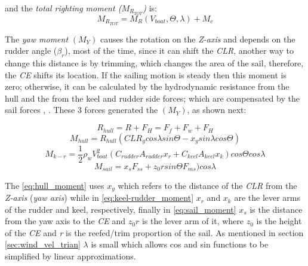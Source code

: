 and the \textit{total righting moment ($M_{R_{TOT}}$)} is:
\begin{equation} \label{eq:Mr_tot}
    M_{R_{TOT}}=M_{R}(V_{boat}, \Theta, \lambda) + M_{c}
\end{equation}

The \textit{yaw moment} $(M_{Y})$ causes the rotation on the \textit{Z-axis} and depends on the rudder angle (\textit{$\beta_{r}$}), most of the time, since it can shift the \textit{CLR}, another way to change this distance is by trimming, which changes the area of the sail, therefore, the \textit{CE} shifts its location. If the sailing motion is steady then this moment is zero; otherwise, it can be calculated by the hydrodynamic resistance from the hull and the from the keel and rudder side forces; which are compensated by the sail forces \cite{philpott1993yacht}, \cite{claughton1998sailing}. These 3 forces generated the $(M_{Y})$, as shown next: \par
\begin{equation}\label{eq:Hull_R}
    R_{hull}=R+F_{H}=F_{f}+F_{w}+F_{H}
\end{equation}
\begin{equation}\label{eq:hull_moment}
   M_{hull}=R_{hull}(CLR_{y} cos \lambda sin \Theta - x_{y} sin \lambda cos \Theta) 
\end{equation}
\begin{equation}\label{eq:keel-rudder_moment}
   M_{k-r}=\frac{1}{2}\rho_{w} V_{boat}^2(C_{rudder}A_{rudder}x_{r}+C_{keel}A_{keel}x_{k})cos \Theta cos \lambda
\end{equation}
\begin{equation}\label{eq:sail_moment}
    M_{sail}=x_{s}F_{ss}+z_{0}r sin \Theta F_{ms}) cos \lambda
\end{equation}


The \ref{eq:hull_moment} uses $x_{y}$ which refers to the distance of the \textit{CLR} from the \textit{Z-axis} (\textit{yaw axis}) while in \ref{eq:keel-rudder_moment} $x_{r}$ and $x_{k}$ are the lever arms of the rudder and keel, respectively, finally in \ref{eq:sail_moment} $x_{s}$ is the distance from the yaw axis to the \textit{CE} and $z_{0}r$ is the lever arm of it, where $z_{0}$ is the height of the \textit{CE}  and \textit{r} is the reefed/trim proportion of the sail. As mentioned in section \ref{sec:wind_vel_trian} $\lambda$ is small which allows cos and sin functions to be simplified by linear approximations. \par 

